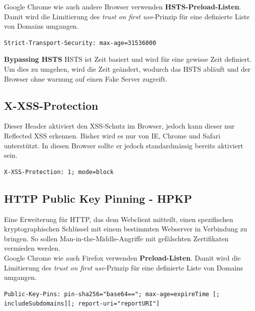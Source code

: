 Google Chrome wie auch andere Browser verwenden \textbf{HSTS-Preload-Listen}. Damit wird die Limitierung des \textit{trust on first use}-Prinzip für eine definierte Liste von Domains umgangen.

\begin{lstlisting}[language={},caption=HSTS-Header]
Strict-Transport-Security: max-age=31536000
\end{lstlisting}

\textbf{Bypassing HSTS}
HSTS ist Zeit basiert und wird für eine gewisse Zeit definiert. Um dies zu umgehen, wird die Zeit geändert, wodurch das HSTS abläuft und der Browser ohne warnung auf einen Fake Server zugreift.

\subsection{X-XSS-Protection}
Dieser Header aktiviert den XSS-Schutz im Browser, jedoch kann dieser nur Reflected XSS erkennen. Bisher wird es nur von IE, Chrome und Safari unterstützt. In diesen Browser sollte er jedoch standardmässig bereits aktiviert sein.

\begin{lstlisting}[language={},caption=Beispiel des X-XSS-Protection Headers]
X-XSS-Protection: 1; mode=block
\end{lstlisting}

\subsection{HTTP Public Key Pinning - HPKP}
Eine Erweiterung für HTTP, das dem Webclient mitteilt, einen spezifischen kryptographischen Schlüssel mit einem bestimmten Webserver in Verbindung zu bringen. So sollen Man-in-the-Middle-Angriffe mit gefälschten Zertifikaten vermieden werden.\\

Google Chrome wie auch Firefox verwenden \textbf{Preload-Listen}. Damit wird die Limitierung des \textit{trust on first use}-Prinzip für eine definierte Liste von Domains umgangen.

\begin{lstlisting}[language={},caption=Beispiel des HPKP-Headers]
Public-Key-Pins: pin-sha256="base64=="; max-age=expireTime [; includeSubdomains][; report-uri="reportURI"]
\end{lstlisting}